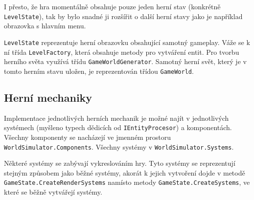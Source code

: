 I přesto, že hra momentálně obsahuje pouze jeden herní stav (konkrétně \texttt{LevelState}), tak by bylo snadné ji rozšířit o další herní stavy jako je například obrazovka s hlavním menu.

\texttt{LevelState} reprezentuje herní obrazovku obsahující samotný gameplay. Váže se k ní třída \texttt{LevelFactory}, která obsahuje metody pro vytváření entit. Pro tvorbu herního světa využívá třídu \texttt{GameWorldGenerator}. Samotný herní svět, který je v tomto herním stavu uložen, je reprezentován třídou \texttt{GameWorld}.

\subsection{Herní mechaniky}
Implementace jednotlivých herních mechanik je možné najít v jednotlivých systémech (myšleno typech dědicích od \texttt{IEntityProcesor}) a komponentách. Všechny komponenty se nacházejí ve jmenném prostoru \texttt{WorldSimulator.Components}. Všechny systémy v \texttt{WorldSimulator.Systems}.

Některé systémy se zabývají vykreslováním hry. Tyto systémy se reprezentují stejným způsobem jako běžné systémy, akorát k jejich vytvoření dojde v metodě \texttt{GameState.CreateRenderSystems} namísto metody \texttt{GameState.CreateSystems}, ve které se běžně vytvářejí systémy.




